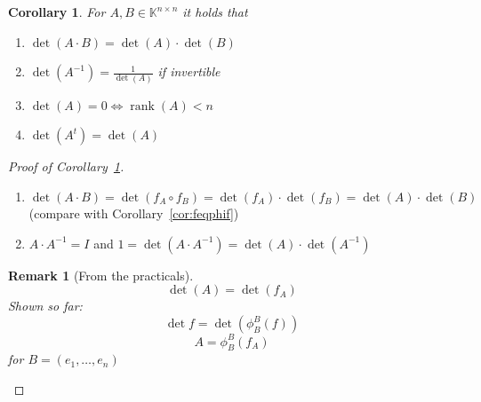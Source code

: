 \documentclass{article}
\newtheorem{remark}{Remark}  \numberwithin{remark}{section}
\newtheorem{corollary}{Corollary}  \numberwithin{corollary}{section}
\DeclareMathOperator{\rank}{rank}
\begin{document}
\begin{corollary} %
  \label{cor730}
  For $A, B \in \mathbb K^{n\times n}$ it holds that
  \begin{enumerate}
    \item $\det(A \cdot B) = \det(A) \cdot \det(B)$
    \item $\det(A^{-1}) = \frac{1}{\det(A)}$ if invertible
    \item $\det(A) = 0 \iff \rank(A) < n$
    \item $\det(A^t) = \det(A)$
  \end{enumerate}
\end{corollary}

\begin{proof}[Proof of Corollary~\ref{cor730}]
  \begin{enumerate}
    \item $\det(A \cdot B) = \det(f_A \circ f_B) = \det(f_A) \cdot \det(f_B) = \det(A) \cdot \det(B)$ (compare with Corollary~\ref{cor:feqphif})
    \item $A \cdot A^{-1} = I$ and $1 = \det(A \cdot A^{-1}) = \det(A) \cdot \det(A^{-1})$
  \end{enumerate}
  \begin{remark}[From the practicals]
    \[ \det(A) = \det(f_A) \]
    Shown so far:
    \[ \det{f} = \det\left(\phi_B^B(f)\right) \]
    \[ A = \phi_B^B\left(f_A\right) \]
    for $B = (e_1, \dots, e_n)$
  \end{remark}
\end{proof}
\end{document}
